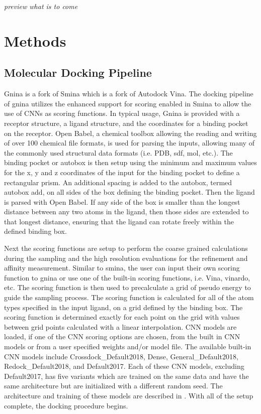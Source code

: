 \documentclass[journal=jcisd8,manuscript=article]{achemso}
\begin{document}
\textit{preview what is to come}

\section{Methods}

\subsection{Molecular Docking Pipeline}
Gnina is a fork of Smina which is a fork of Autodock Vina. The docking pipeline of gnina utilizes the enhanced support for scoring enabled in Smina to allow the use of CNNs as scoring functions. In typical usage, Gnina is provided with a receptor structure, a ligand structure, and the coordinates for a binding pocket on the receptor. Open Babel\cite{o2011open,babelopen}, a chemical toolbox allowing the reading and writing of over 100 chemical file formats, is used for parsing the inputs, allowing many of the commonly used structural data formats (i.e. PDB, sdf, mol, etc.). The binding pocket or autobox is then setup using the minimum and maximum values for the x, y and z coordinates of the input for the binding pocket to define a rectangular prism. An additional spacing is added to the autobox, termed autobox add, on all sides of the box defining the binding pocket. Then the ligand is parsed with Open Babel. If any side of the box is smaller than the longest distance between any two atoms in the ligand, then those sides are extended to that longest distance, ensuring that the ligand can rotate freely within the defined binding box.

Next the scoring functions are setup to perform the coarse grained calculations during the sampling and the high resolution evaluations for the refinement and affinity measurement. Similar to smina, the user can input their own scoring function to gnina or use one of the built-in scoring functions, i.e. Vina, vinardo, etc. The scoring function is then used to precalculate a grid of pseudo energy to guide the sampling process. The scoring function is calculated for all of the atom types specified in the input ligand, on a grid defined by the binding box. The scoring function is determined exactly for each point on the grid with values between grid points calculated with a linear interpolation. CNN models are loaded, if one of the CNN scoring options are chosen, from the built in CNN models or from a user specified weights and/or model file. The available built-in CNN models include Crossdock\_Default2018, Dense, General\_Default2018, Redock\_Default2018, and Default2017. Each of these CNN models, excluding Default2017, has five variants which are trained on the same data and have the same architecture but are initialized with a different random seed. The architecture and training of these models are described in \cite{francoeur2020three,Ragoza2017}. With all of the setup complete, the docking procedure begins.
\end{document}
